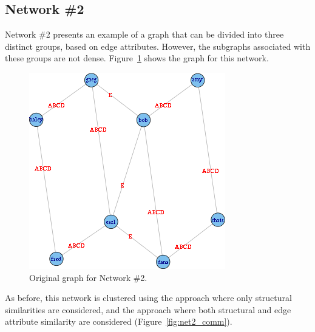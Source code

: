 \documentclass{report} %
\begin{document}


\subsection*{Network \#2}

Network \#2 presents an example of a graph that can be divided into three distinct groups, based on edge attributes. However, the subgraphs associated with these groups are not dense. Figure~\ref{fig:net2_orig} shows the graph for this network.\\

\begin{figure}[htp!]
  \centering
  \includegraphics[width=0.42\linewidth]{toy3/orig.png}
  \caption{Original graph for Network \#2.}
  \label{fig:net2_orig}
\end{figure}
\newpage
As before, this network is clustered using the approach where only structural similarities are considered, and the approach where both structural and edge attribute similarity are considered (Figure~\ref{fig:net2_comm}).\\
\end{document}
